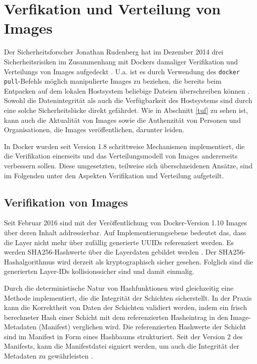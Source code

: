 \documentclass[../main.tex]{subfiles}
\begin{document}
  \section{Verfikation und Verteilung von Images}
    Der Sicherheitsforscher Jonathan Rudenberg hat im Dezember 2014 drei Sicherheitsrisiken im Zusammenhang mit Dockers damaliger Verifikation und Verteilungs von Images aufgedeckt \cite{githubRegistryV1Issues}\cite{registryV1IssuesRudenberg}. U.a. ist es durch Verwendung des \texttt{docker pull}-Befehls möglich manipulierte Images zu beziehen, die bereits beim Entpacken auf dem lokalen Hostsystem beliebige Dateien überschreiben können \cite{registryV1IssuesRedHat}. Sowohl die Datenintegrität als auch die Verfügbarkeit des Hostsystems sind durch eine solche Sicherheitslücke direkt gefährdet. Wie in Abschnitt \ref{tuf} zu sehen ist, kann auch die Aktualität von Images sowie die Authenzität von Personen und Organisationen, die Images veröffentlichen, darunter leiden.

    In Docker wurden seit Version 1.8 schrittweise Mechanismen implementiert, die die Verifikation einerseits und das Verteilungsmodell von Images andererseits verbessern sollen. Diese umgesetzten, teilweise sich überschneidenen Ansätze, sind im Folgenden unter den Aspekten Verifikation und Verteilung aufgeteilt.

    \subsection{Verifikation von Images}
      Seit Februar 2016 sind mit der Veröffentlichung von Docker-Version 1.10 Images über deren Inhalt addressierbar. Auf Implementierungsebene bedeutet das, dass die Layer nicht mehr über zufällig generierte UUIDs referenziert werden. Es werden SHA256-Hashwerte über die Layerdaten gebildet werden \cite[S.16]{slideshareImageDistribution}. Der SHA256-Hashalgorithmus wird derzeit als kryptographisch sicher gesehen. Folglich sind die generierten Layer-IDs kollisionssicher sind und damit einmalig.

      Durch die deterministische Natur von Hashfunktionen wird gleichzeitig eine Methode implementiert, die die Integrität der Schichten sicherstellt. In der Praxis kann die Korrektheit von Daten der Schichten validiert werden, indem ein frisch berechneter Hash einer Schicht mit dem referenzierten Hasheintrag in den Image-Metadaten (Manifest) verglichen wird. Die referenzierten Hashwerte der Schicht sind im Manifest in Form eines Hashbaums strukturiert. Seit der Version 2 des Manifests, kann die Manifestdatei signiert werden, um auch die Integrität der Metadaten zu gewährleisten \cite{githubImageManifest21}.
\end{document}

